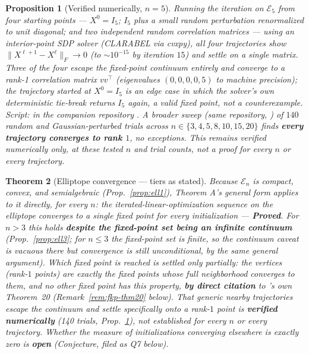 \documentclass[11pt]{article}
\theoremstyle{plain}
\newtheorem{theorem}{Theorem}[section]
\newtheorem{proposition}[theorem]{Proposition}
\theoremstyle{definition}
\theoremstyle{remark}
\newcommand{\El}{\mathcal E_n}
\begin{document}
\begin{proposition}[Verified numerically, $n=5$]\label{prop:ell4}
Running the iteration on $\mathcal E_5$ from four starting points ---
$X^0=I_5$; $I_5$ plus a small random perturbation renormalized to unit
diagonal; and two independent random correlation matrices --- using an
interior-point SDP solver (CLARABEL via cvxpy), all four trajectories show
$\|X^{\ell+1}-X^\ell\|_F\to0$ (to $\sim10^{-15}$ by iteration $15$) and
settle on a single matrix. Three of the four escape the fixed-point
continuum entirely and converge to a rank-1 correlation matrix $vv^\top$
(eigenvalues $(0,0,0,0,5)$ to machine precision); the trajectory started at
$X^0=I_5$ is an edge case in which the solver's own deterministic tie-break
returns $I_5$ again, a valid fixed point, not a counterexample. Script:
 in the companion
repository \cite{CazacAlgorithmRepo}. A broader sweep (same repository,
) of $140$ random and
Gaussian-perturbed trials across $n\in\{3,4,5,8,10,15,20\}$ finds
\textbf{every trajectory converges to rank $1$}, no exceptions. This
remains \emph{verified numerically only}, at these tested $n$ and trial
counts, not a proof for every $n$ or every trajectory.
\end{proposition}

\begin{theorem}[Elliptope convergence --- tiers as stated]\label{thm:ell}
Because $\El$ is compact, convex, and semialgebraic (Prop.~\ref{prop:ell1}),
Theorem A's general form applies to it directly, for every $n$: the
iterated-linear-optimization sequence on the elliptope converges to a
single fixed point for every initialization --- \textbf{Proved}. For $n>3$
this holds \textbf{despite the fixed-point set being an infinite
continuum} (Prop.~\ref{prop:ell3}; for $n\le3$ the fixed-point set is
finite, so the continuum caveat is vacuous there but convergence is still
unconditional, by the same general argument). Which
fixed point is reached is settled only partially: the vertices (rank-$1$
points) are exactly the fixed points whose full neighborhood converges to
them, and no other fixed point has this property, \textbf{by direct
citation} to \cite{FKP21}'s own Theorem~20 (Remark~\ref{rem:fkp-thm20}
below). That generic nearby trajectories escape the continuum and settle
specifically onto a rank-$1$ point is \textbf{verified numerically} (140
trials, Prop.~\ref{prop:ell4}), not established for every $n$ or every
trajectory. Whether the measure of initializations converging elsewhere
is exactly zero is \textbf{open} (Conjecture, filed as Q7 below).
\end{theorem}
\end{document}
